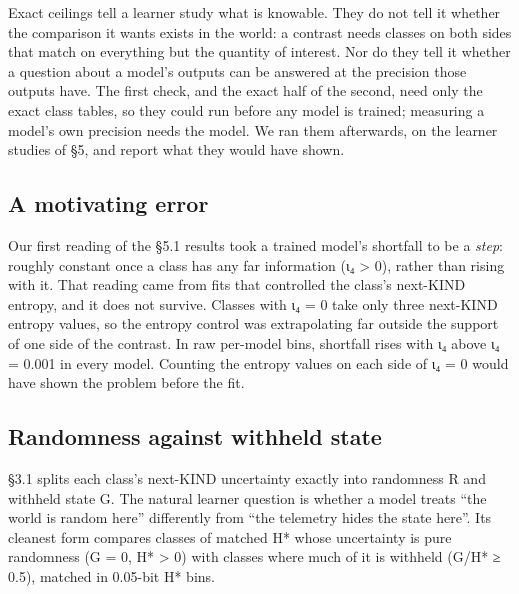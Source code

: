 \documentclass[10pt]{article}
\begin{document}
Exact ceilings tell a learner study what is knowable. They do not tell it whether the comparison it wants exists in the
world: a contrast needs classes on both sides that match on everything but the quantity of interest. Nor do they tell
it whether a question about a model's outputs can be answered at the precision those outputs have. The first check,
and the exact half of the second, need only the exact class tables, so they could run before any model is trained;
measuring a model's own precision needs the model. We ran them afterwards, on the learner studies of §5, and report what
they would have shown.

\hypertarget{a-motivating-error}{%
\subsection{A motivating error}\label{a-motivating-error}}

Our first reading of the §5.1 results took a trained model's shortfall to be a \emph{step}: roughly constant once a class has
any far information (ι₄ \textgreater{} 0), rather than rising with it. That reading came from fits that controlled the class's
next-KIND entropy, and it does not survive. Classes with ι₄ = 0 take only three next-KIND entropy values, so the entropy
control was extrapolating far outside the support of one side of the contrast. In raw per-model bins, shortfall rises
with ι₄ above ι₄ = 0.001 in every model. Counting the entropy values on each side of ι₄ = 0 would have shown the problem
before the fit.

\hypertarget{randomness-against-withheld-state}{%
\subsection{Randomness against withheld state}\label{randomness-against-withheld-state}}

§3.1 splits each class's next-KIND uncertainty exactly into randomness R and withheld state G. The natural learner
question is whether a model treats ``the world is random here'' differently from ``the telemetry hides the state here''.
Its cleanest form compares classes of matched H* whose uncertainty is pure randomness (G = 0, H* \textgreater{} 0) with classes
where much of it is withheld (G/H* ≥ 0.5), matched in 0.05-bit H* bins.
\end{document}
